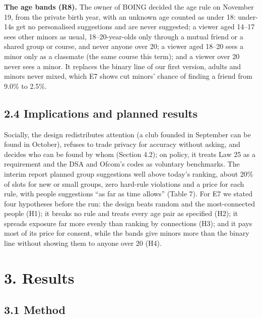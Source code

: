 \documentclass[11pt,letterpaper]{article}
\begin{document}
\textbf{The age bands (R8).} The owner of BOING decided the age rule on November 19, from the private birth
year, with an unknown age counted as under 18: under-14s get no personalised suggestions and are never
suggested; a viewer aged 14--17 sees other minors as usual, 18--20-year-olds only through a mutual friend or a
shared group or course, and never anyone over 20; a viewer aged 18--20 sees a minor only as a classmate (the
same course this term); and a viewer over 20 never sees a minor. It replaces the binary line of our first
version, adults and minors never mixed, which E7 shows cut minors' chance of finding a friend from 9.0\% to
2.5\%.

\subsection{2.4 Implications and planned results}

Socially, the design redistributes attention (a club founded in September can be found in October), refuses to
trade privacy for accuracy without asking, and decides who can be found by whom (Section 4.2); on policy, it
treats Law 25 as a requirement and the DSA and Ofcom's codes as voluntary benchmarks. The interim report
planned group suggestions well above today's ranking, about 20\% of slots for new or small groups, zero
hard-rule violations and a price for each rule, with people suggestions ``as far as time allows'' (Table 7).
For E7 we stated four hypotheses before the run: the design beats random and the most-connected people (H1);
it breaks no rule and treats every age pair as specified (H2); it spreads exposure far more evenly than
ranking by connections (H3); and it pays most of its price for consent, while the bands give minors more than
the binary line without showing them to anyone over 20 (H4).

\section{3. Results}

\subsection{3.1 Method}
\end{document}
